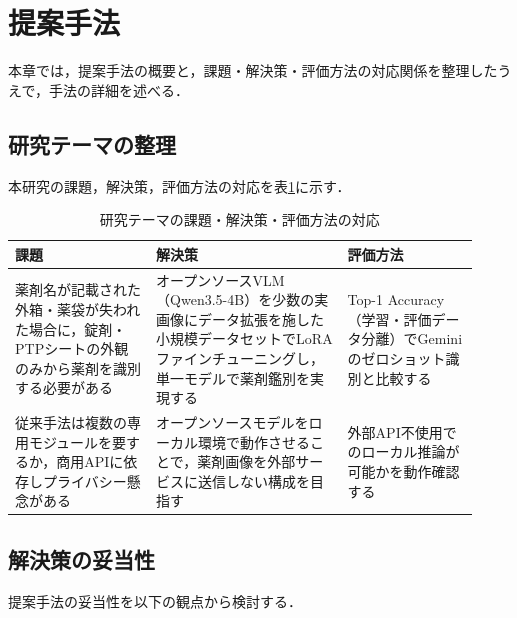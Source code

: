 \documentclass[dvipdfmx]{jsarticle}
\begin{document}
\newpage

\section{提案手法}\label{sec3}

本章では，提案手法の概要と，課題・解決策・評価方法の対応関係を整理したうえで，手法の詳細を述べる．

\subsection{研究テーマの整理}

本研究の課題，解決策，評価方法の対応を表\ref{tab:theme}に示す．

\begin{table}[h]
\centering
\caption{研究テーマの課題・解決策・評価方法の対応}
\label{tab:theme}
\small
\setlength{\tabcolsep}{4pt}
\begin{tabular}{p{0.28\linewidth}p{0.38\linewidth}p{0.26\linewidth}}
\hline
課題 & 解決策 & 評価方法 \\
\hline
薬剤名が記載された外箱・薬袋が失われた場合に，錠剤・PTPシートの外観のみから薬剤を識別する必要がある &
オープンソースVLM（Qwen3.5-4B）を少数の実画像にデータ拡張を施した小規模データセットでLoRAファインチューニングし，単一モデルで薬剤鑑別を実現する &
Top-1 Accuracy（学習・評価データ分離）でGeminiのゼロショット識別と比較する \\
\hline
従来手法は複数の専用モジュールを要するか，商用APIに依存しプライバシー懸念がある &
オープンソースモデルをローカル環境で動作させることで，薬剤画像を外部サービスに送信しない構成を目指す &
外部API不使用でのローカル推論が可能かを動作確認する \\
\hline
\end{tabular}
\end{table}

\subsection{解決策の妥当性}

提案手法の妥当性を以下の観点から検討する．
\end{document}
